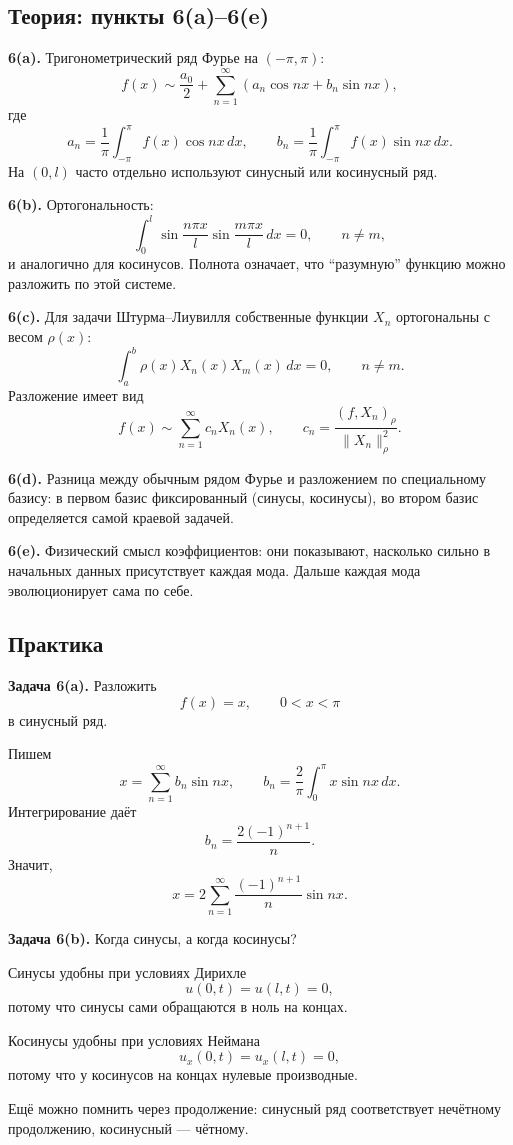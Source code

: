 \documentclass[a4paper,12pt]{article}
\begin{document}
\subsection{Теория: пункты 6(a)--6(e)}

\textbf{6(a).} Тригонометрический ряд Фурье на $(-\pi,\pi)$:
\[
f(x)\sim \frac{a_0}{2}+\sum_{n=1}^\infty (a_n\cos nx+b_n\sin nx),
\]
где
\[
a_n=\frac1\pi\int_{-\pi}^{\pi}f(x)\cos nx\,dx,
\qquad
b_n=\frac1\pi\int_{-\pi}^{\pi}f(x)\sin nx\,dx.
\]
На $(0,l)$ часто отдельно используют синусный или косинусный ряд.

\textbf{6(b).} Ортогональность:
\[
\int_0^l \sin\frac{n\pi x}{l}\sin\frac{m\pi x}{l}\,dx=0,
\qquad n\ne m,
\]
и аналогично для косинусов. Полнота означает, что ``разумную'' функцию можно разложить по этой системе.

\textbf{6(c).} Для задачи Штурма--Лиувилля собственные функции $X_n$ ортогональны с весом $\rho(x)$:
\[
\int_a^b \rho(x)X_n(x)X_m(x)\,dx=0,
\qquad n\ne m.
\]
Разложение имеет вид
\[
f(x)\sim \sum_{n=1}^\infty c_n X_n(x),
\qquad
c_n=\frac{(f,X_n)_\rho}{\|X_n\|_\rho^2}.
\]

\textbf{6(d).} Разница между обычным рядом Фурье и разложением по специальному базису: в первом базис фиксированный (синусы, косинусы), во втором базис определяется самой краевой задачей.

\textbf{6(e).} Физический смысл коэффициентов: они показывают, насколько сильно в начальных данных присутствует каждая мода. Дальше каждая мода эволюционирует сама по себе.

\subsection{Практика}

\textbf{Задача 6(a).} Разложить
\[
f(x)=x,
\qquad 0<x<\pi
\]
в синусный ряд.

Пишем
\[
x=\sum_{n=1}^\infty b_n\sin nx,
\qquad
b_n=\frac{2}{\pi}\int_0^\pi x\sin nx\,dx.
\]
Интегрирование даёт
\[
b_n=\frac{2(-1)^{n+1}}{n}.
\]
Значит,
\[
x=2\sum_{n=1}^\infty \frac{(-1)^{n+1}}{n}\sin nx.
\]

\textbf{Задача 6(b).} Когда синусы, а когда косинусы?

Синусы удобны при условиях Дирихле
\[
u(0,t)=u(l,t)=0,
\]
потому что синусы сами обращаются в ноль на концах.

Косинусы удобны при условиях Неймана
\[
u_x(0,t)=u_x(l,t)=0,
\]
потому что у косинусов на концах нулевые производные.

Ещё можно помнить через продолжение: синусный ряд соответствует нечётному продолжению, косинусный --- чётному.
\end{document}

